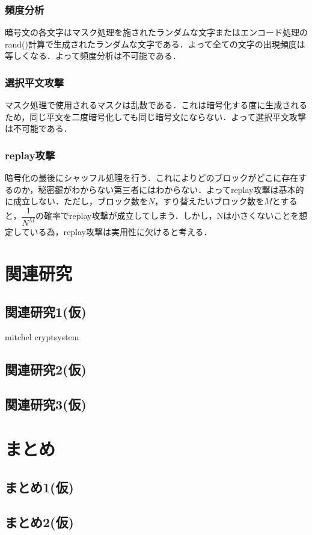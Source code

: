 \documentclass{jsarticle}
\begin{document}
\subsubsection{頻度分析}
暗号文の各文字はマスク処理を施されたランダムな文字またはエンコード処理のrand()計算で生成されたランダムな文字である．よって全ての文字の出現頻度は等しくなる．よって頻度分析は不可能である．
\subsubsection{選択平文攻撃}
マスク処理で使用されるマスクは乱数である．これは暗号化する度に生成されるため，同じ平文を二度暗号化しても同じ暗号文にならない．よって選択平文攻撃は不可能である．
\subsubsection{replay攻撃}
暗号化の最後にシャッフル処理を行う．これによりどのブロックがどこに存在するのか，秘密鍵がわからない第三者にはわからない．よってreplay攻撃は基本的に成立しない．ただし，ブロック数を$N$，すり替えたいブロック数を$M$とすると，$\dfrac{1}{N^M}$の確率でreplay攻撃が成立してしまう．しかし，Nは小さくないことを想定している為，replay攻撃は実用性に欠けると考える．
\section{関連研究}
\subsection{関連研究1(仮)}
mitchel cryptsystem
\subsection{関連研究2(仮)}
\subsection{関連研究3(仮)}

\section{まとめ}
\subsection{まとめ1(仮)}
\subsection{まとめ2(仮)}
\end{document}

